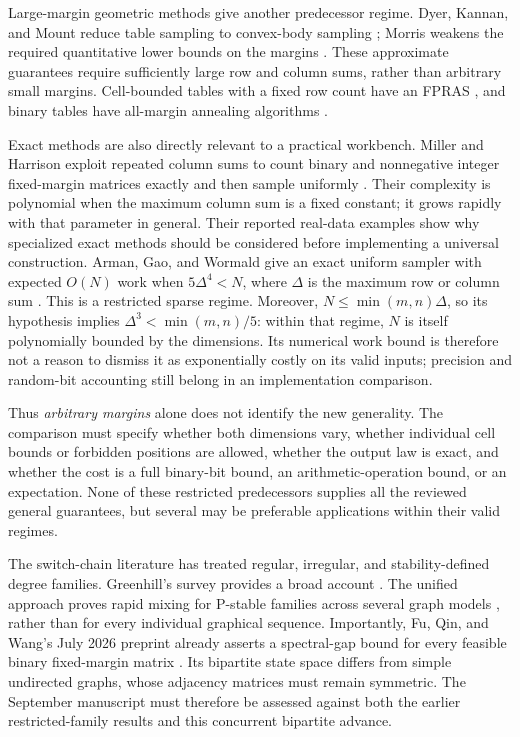\documentclass[11pt]{article}
\begin{document}
Large-margin geometric methods give another predecessor regime. Dyer, Kannan, and Mount reduce table sampling to convex-body sampling \cite{DKM1997}; Morris weakens the required quantitative lower bounds on the margins \cite{Morris2002}. These approximate guarantees require sufficiently large row and column sums, rather than arbitrary small margins. Cell-bounded tables with a fixed row count have an FPRAS \cite{CDR2010}, and binary tables have all-margin annealing algorithms \cite{BBV2007}.

Exact methods are also directly relevant to a practical workbench. Miller and Harrison exploit repeated column sums to count binary and nonnegative integer fixed-margin matrices exactly and then sample uniformly \cite{MH2013}. Their complexity is polynomial when the maximum column sum is a fixed constant; it grows rapidly with that parameter in general. Their reported real-data examples show why specialized exact methods should be considered before implementing a universal construction. Arman, Gao, and Wormald give an exact uniform sampler with expected \(O(N)\) work when \(5\Delta^4<N\), where \(\Delta\) is the maximum row or column sum \cite{AGW2024}. This is a restricted sparse regime. Moreover, \(N\leq\min(m,n)\Delta\), so its hypothesis implies \(\Delta^3<\min(m,n)/5\): within that regime, \(N\) is itself polynomially bounded by the dimensions. Its numerical work bound is therefore not a reason to dismiss it as exponentially costly on its valid inputs; precision and random-bit accounting still belong in an implementation comparison.

Thus \emph{arbitrary margins} alone does not identify the new generality. The comparison must specify whether both dimensions vary, whether individual cell bounds or forbidden positions are allowed, whether the output law is exact, and whether the cost is a full binary-bit bound, an arithmetic-operation bound, or an expectation. None of these restricted predecessors supplies all the reviewed general guarantees, but several may be preferable applications within their valid regimes.

The switch-chain literature has treated regular, irregular, and stability-defined degree families. Greenhill's survey provides a broad account \cite{Greenhill2021}. The unified approach proves rapid mixing for P-stable families across several graph models \cite{Unified2022}, rather than for every individual graphical sequence. Importantly, Fu, Qin, and Wang's July 2026 preprint already asserts a spectral-gap bound for every feasible binary fixed-margin matrix \cite{FQW2026}. Its bipartite state space differs from simple undirected graphs, whose adjacency matrices must remain symmetric. The September manuscript must therefore be assessed against both the earlier restricted-family results and this concurrent bipartite advance.
\end{document}
